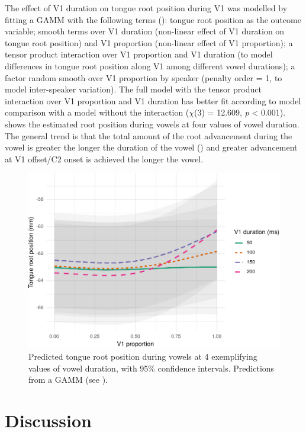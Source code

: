 \documentclass[preprint]{JASAnew}
\begin{document}
\label{s:trp-v1-dur}

The effect of V1 duration on tongue root position during V1 was modelled
by fitting a GAMM with the following terms
(): tongue root position as the outcome
variable; smooth terms over V1 duration (non-linear effect of V1
duration on tongue root position) and V1 proportion (non-linear effect
of V1 proportion); a tensor product interaction over V1 proportion and
V1 duration (to model differences in tongue root position along V1 among
different vowel durations); a factor random smooth over V1 proportion by
speaker (penalty order = 1, to model inter-speaker variation). The full
model with the tensor product interaction over V1 proportion and V1
duration has better fit according to model comparison with a model
without the interaction (\(\chi\)(3) = 12.609, \emph{p} \textless{}
0.001).  shows the estimated root position during vowels
at four values of vowel duration. The general trend is that the total
amount of the root advancement during the vowel is greater the longer
the duration of the vowel () and greater advancement at
V1 offset/C2 onset is achieved the longer the vowel.

\begin{figure}
\includegraphics[width=\linewidth]{./Figure6} \caption{Predicted tongue root position during vowels at 4 exemplifying values of vowel duration, with 95\% confidence intervals. Predictions from a GAMM (see ).}\label{f:Figure6}
\end{figure}

\hypertarget{discussion}{%
\section{Discussion}\label{discussion}}
\end{document}

